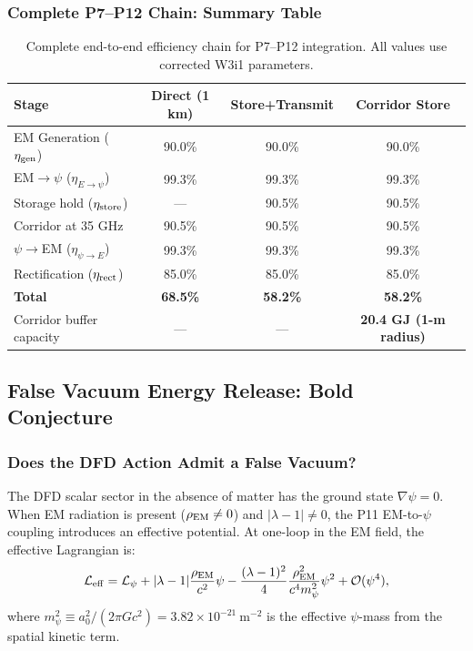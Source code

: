\documentclass[aps,prd,twocolumn,superscriptaddress]{revtex4-2}
\newcommand{\azero}{a_0}
\newcommand{\lam}{|\lambda-1|}
\begin{document}
\subsubsection{Complete P7--P12 Chain: Summary Table}

\begin{table}[h]
\caption{Complete end-to-end efficiency chain for P7--P12 integration.
All values use corrected W3i1 parameters.}
\label{tab:chain}
\begin{ruledtabular}
\begin{tabular}{lccc}
Stage & Direct (1 km) & Store+Transmit & Corridor Store \\
\hline
EM Generation ($\eta_{\rm gen}$) & 90.0\% & 90.0\% & 90.0\% \\
EM$\to\psi$ ($\eta_{E\to\psi}$) & 99.3\% & 99.3\% & 99.3\% \\
Storage hold ($\eta_{\rm store}$) & --- & 90.5\% & 90.5\% \\
Corridor at 35 GHz & 90.5\% & 90.5\% & 90.5\% \\
$\psi\to$EM ($\eta_{\psi\to E}$) & 99.3\% & 99.3\% & 99.3\% \\
Rectification ($\eta_{\rm rect}$) & 85.0\% & 85.0\% & 85.0\% \\
\midrule
\textbf{Total} & \textbf{68.5\%} & \textbf{58.2\%} & \textbf{58.2\%} \\
Corridor buffer capacity & --- & --- & \textbf{20.4 GJ (1-m radius)} \\
\end{tabular}
\end{ruledtabular}
\end{table}

\subsection{False Vacuum Energy Release: Bold Conjecture}
\label{sec:false-vacuum}

\subsubsection{Does the DFD Action Admit a False Vacuum?}

The DFD scalar sector in the absence of matter has the ground state
$\nabla\psi = 0$.  When EM radiation is present ($\rho_{\rm EM} \neq 0$)
and $\lam \neq 0$, the P11 EM-to-$\psi$ coupling introduces an effective
potential.  At one-loop in the EM field, the effective Lagrangian is:
\begin{equation}
\mathcal{L}_{\rm eff}
= \mathcal{L}_\psi
+ \lam\frac{\rho_{\rm EM}}{c^2}\psi
- \frac{(\lambda-1)^2}{4}\frac{\rho_{\rm EM}^2}{c^4 m_\psi^2}\psi^2
+ \mathcal{O}(\psi^4),
\end{equation}
where $m_\psi^2 \equiv \azero^2/(2\pi G c^2) = 3.82\times 10^{-21}~\mathrm{m^{-2}}$
is the effective $\psi$-mass from the spatial kinetic term.
\end{document}
